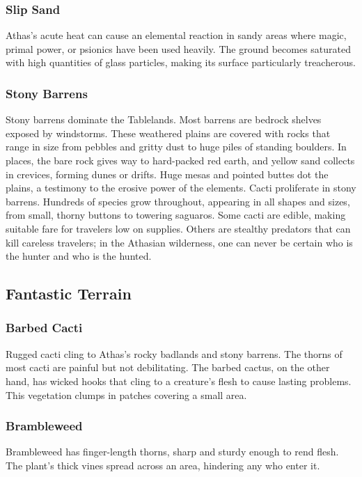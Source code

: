 \begin{multicols}{2}
\subsubsection{Slip Sand}
Athas's acute heat can cause an elemental reaction in sandy areas where magic,
primal power, or psionics have been used heavily. The ground becomes saturated
with high quantities of glass particles, making its surface particularly treacherous.


\subsubsection{Stony Barrens}

Stony barrens dominate the Tablelands. Most barrens are bedrock shelves exposed
by windstorms. These weathered plains are covered with rocks that range in size
from pebbles and gritty dust to huge piles of standing boulders. In places,
the bare rock gives way to hard-packed red earth, and yellow sand collects in
crevices, forming dunes or drifts. Huge mesas and pointed buttes dot the plains,
a testimony to the erosive power of the elements. Cacti proliferate in stony
barrens. Hundreds of species grow throughout, appearing in all shapes and
sizes, from small, thorny buttons to towering saguaros. Some cacti are edible,
making suitable fare for travelers low on supplies. Others are stealthy
predators that can kill careless travelers; in the Athasian wilderness, one
can never be certain who is the hunter and who is the hunted.

\subsection{Fantastic Terrain}

\subsubsection{Barbed Cacti}
Rugged cacti cling to Athas’s rocky badlands and
stony barrens. The thorns of most cacti are painful
but not debilitating. The barbed cactus, on the other
hand, has wicked hooks that cling to a creature’s flesh
to cause lasting problems. This vegetation clumps in
patches covering a small area.

\subsubsection{Brambleweed}
Brambleweed has finger-length thorns, sharp and
sturdy enough to rend flesh. The plant's thick vines
spread across an area, hindering any who enter it.


\end{multicols}
